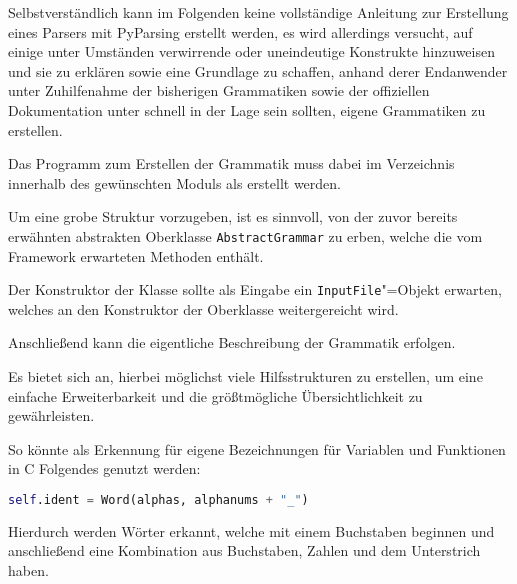                 Selbstverständlich kann im Folgenden keine vollständige Anleitung zur Erstellung eines Parsers mit PyParsing erstellt werden,
                es wird allerdings versucht,
                auf einige unter Umständen verwirrende oder
                uneindeutige Konstrukte hinzuweisen und
                sie zu erklären sowie
                eine Grundlage zu schaffen,
                anhand derer Endanwender unter Zuhilfenahme der bisherigen Grammatiken sowie
                der offiziellen Dokumentation unter
                \cite{McGuire2018a} schnell in der Lage sein sollten,
                eigene Grammatiken zu erstellen.

                Das Programm zum Erstellen der Grammatik muss dabei im Verzeichnis
                 innerhalb des gewünschten Moduls als
                 erstellt werden.

                Um eine grobe Struktur vorzugeben,
                ist es sinnvoll,
                von der zuvor bereits erwähnten abstrakten Oberklasse
                \lstinline{AbstractGrammar} zu erben,
                welche die vom Framework erwarteten Methoden enthält.

                Der Konstruktor der Klasse sollte als Eingabe ein
                \lstinline{InputFile}"=Objekt erwarten,
                welches an den Konstruktor der Oberklasse weitergereicht wird.

                Anschließend kann die eigentliche Beschreibung der Grammatik erfolgen.

                Es bietet sich an,
                hierbei möglichst viele Hilfsstrukturen zu erstellen,
                um eine einfache Erweiterbarkeit und
                die größtmögliche Übersichtlichkeit zu gewährleisten.

                So könnte als Erkennung für eigene Bezeichnungen für Variablen und
                Funktionen in C Folgendes genutzt werden:

                \begin{lstlisting}[caption={Erkennung von Bezeichnungen in C}, gobble=20, language=python]
                    self.ident = Word(alphas, alphanums + "_")
                \end{lstlisting}

                Hierdurch werden Wörter erkannt,
                welche mit einem Buchstaben beginnen und
                anschließend eine Kombination aus Buchstaben,
                Zahlen und
                dem Unterstrich haben.


